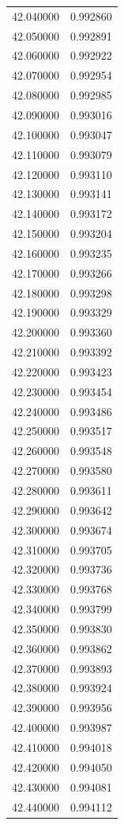 \begin{tabular}{rr}
42.040000 & 0.992860 \\
42.050000 & 0.992891 \\
42.060000 & 0.992922 \\
42.070000 & 0.992954 \\
42.080000 & 0.992985 \\
42.090000 & 0.993016 \\
42.100000 & 0.993047 \\
42.110000 & 0.993079 \\
42.120000 & 0.993110 \\
42.130000 & 0.993141 \\
42.140000 & 0.993172 \\
42.150000 & 0.993204 \\
42.160000 & 0.993235 \\
42.170000 & 0.993266 \\
42.180000 & 0.993298 \\
42.190000 & 0.993329 \\
42.200000 & 0.993360 \\
42.210000 & 0.993392 \\
42.220000 & 0.993423 \\
42.230000 & 0.993454 \\
42.240000 & 0.993486 \\
42.250000 & 0.993517 \\
42.260000 & 0.993548 \\
42.270000 & 0.993580 \\
42.280000 & 0.993611 \\
42.290000 & 0.993642 \\
42.300000 & 0.993674 \\
42.310000 & 0.993705 \\
42.320000 & 0.993736 \\
42.330000 & 0.993768 \\
42.340000 & 0.993799 \\
42.350000 & 0.993830 \\
42.360000 & 0.993862 \\
42.370000 & 0.993893 \\
42.380000 & 0.993924 \\
42.390000 & 0.993956 \\
42.400000 & 0.993987 \\
42.410000 & 0.994018 \\
42.420000 & 0.994050 \\
42.430000 & 0.994081 \\
42.440000 & 0.994112 \\

\end{tabular}
